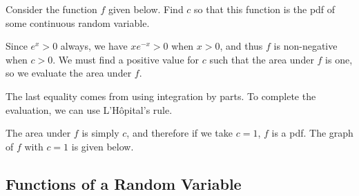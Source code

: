 \begin{examp}Consider the function $f$ given below. Find $c$ so that this function is the pdf of some continuous random variable.
\renewcommand*{\arraystretch}{1.35}
\renewcommand*{\arraystretch}{1}
\par
\noindent Since $e^{x}>0$ always, we have $xe^{-x} > 0$ when $x > 0$, and thus $f$ is non-negative when $c > 0$. We must find a positive value for $c$ such that the area under $f$ is one, so we evaluate the area under $f$.
\par
\noindent The last equality comes from using integration by parts. To complete the evaluation, we can use L'H\^{o}pital's rule.
\par
\noindent The area under $f$ is simply $c$, and therefore if we take $c=1$, $f$ is a pdf. The graph of $f$ with $c = 1$ is given below.
\begin{center}
\end{center}
\end{examp}

\subsection*{Functions of a Random Variable}

